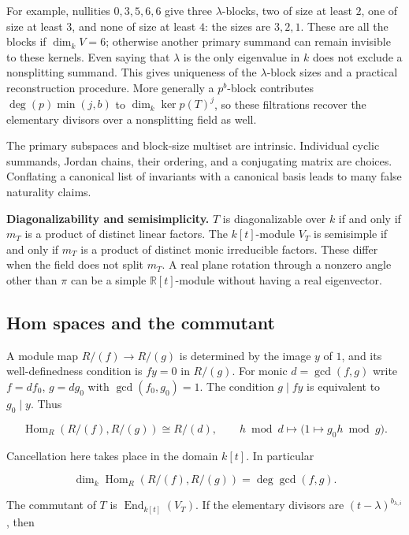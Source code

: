\documentclass[
  11pt,
]{article}
\begin{document}
For example, nullities \(0,3,5,6,6\) give three \(\lambda\)-blocks, two
of size at least \(2\), one of size at least \(3\), and none of size at
least \(4\): the sizes are \(3,2,1\). These are all the blocks if
\(\dim_kV=6\); otherwise another primary summand can remain invisible to
these kernels. Even saying that \(\lambda\) is the only eigenvalue in
\(k\) does not exclude a nonsplitting summand. This gives uniqueness of
the \(\lambda\)-block sizes and a practical reconstruction procedure.
More generally a \(p^b\)-block contributes \(\deg(p)\min(j,b)\) to
\(\dim_k\ker p(T)^j\), so these filtrations recover the elementary
divisors over a nonsplitting field as well.

The primary subspaces and block-size multiset are intrinsic. Individual
cyclic summands, Jordan chains, their ordering, and a conjugating matrix
are choices. Conflating a canonical list of invariants with a canonical
basis leads to many false naturality claims.

\textbf{Diagonalizability and semisimplicity.} \(T\) is diagonalizable
over \(k\) if and only if \(m_T\) is a product of distinct linear
factors. The \(k[t]\)-module \(V_T\) is semisimple if and only if
\(m_T\) is a product of distinct monic irreducible factors. These differ
when the field does not split \(m_T\). A real plane rotation through a
nonzero angle other than \(\pi\) can be a simple \(\mathbb R[t]\)-module
without having a real eigenvector.

\subsection{Hom spaces and the
commutant}\label{hom-spaces-and-the-commutant}

A module map \(R/(f)\to R/(g)\) is determined by the image \(y\) of
\(1\), and its well-definedness condition is \(f y=0\) in \(R/(g)\). For
monic \(d=\gcd(f,g)\) write \(f=d f_0\), \(g=d g_0\) with
\(\gcd(f_0,g_0)=1\). The condition \(g\mid f y\) is equivalent to
\(g_0\mid y\). Thus

\[\operatorname{Hom}_R(R/(f),R/(g))
\cong R/(d),\qquad h\bmod d\longmapsto
\bigl(1\longmapsto g_0h\bmod g\bigr).\]

Cancellation here takes place in the domain \(k[t]\). In particular

\[\dim_k\operatorname{Hom}_R(R/(f),R/(g))=\deg\gcd(f,g).\]

The commutant of \(T\) is \(\operatorname{End}_{k[t]}(V_T)\). If the
elementary divisors are \((t-\lambda)^{b_{\lambda,i}}\), then
\end{document}
